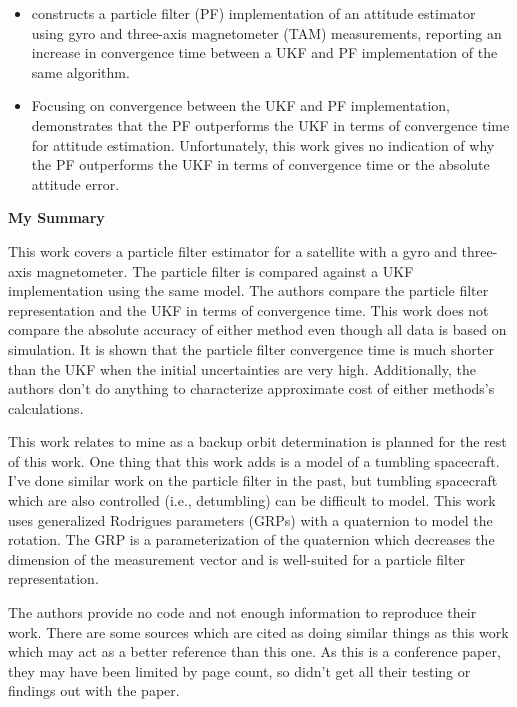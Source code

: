 \begin{itemize}
    \item \cite{xue-yuanjiangSpacecraftAttitudeEstimation2005} constructs a particle filter (PF) implementation of an attitude estimator using gyro and three-axis magnetometer (TAM) measurements, reporting an increase in convergence time between a UKF and PF implementation of the same algorithm.
    \item Focusing on convergence between the UKF and PF implementation, \cite{xue-yuanjiangSpacecraftAttitudeEstimation2005} demonstrates that the PF outperforms the UKF in terms of convergence time for attitude estimation. Unfortunately, this work gives no indication of why the PF outperforms the UKF in terms of convergence time or the absolute attitude error. 
\end{itemize}

\textbf{My Summary} 

This work covers a particle filter estimator for a satellite with a gyro and three-axis magnetometer. The particle filter is compared against a UKF implementation using the same model. The authors compare the particle filter representation and the UKF in terms of convergence time. This work does not compare the absolute accuracy of either method even though all data is based on simulation. It is shown that the particle filter convergence time is much shorter than the UKF when the initial uncertainties are very high. Additionally, the authors don't do anything to characterize approximate cost of either methods's calculations.

This work relates to mine as a backup orbit determination is planned for the rest of this work. One thing that this work adds is a model of a tumbling spacecraft. I've done similar work on the particle filter in the past, but tumbling spacecraft which are also controlled (i.e., detumbling) can be difficult to model. This work uses generalized Rodrigues parameters (GRPs) with a quaternion to model the rotation. The GRP is a parameterization of the quaternion which decreases the dimension of the measurement vector and is well-suited for a particle filter representation.

The authors provide no code and not enough information to reproduce their work. There are some sources which are cited as doing similar things as this work which may act as a better reference than this one. As this is a conference paper, they may have been limited by page count, so didn't get all their testing or findings out with the paper. 

